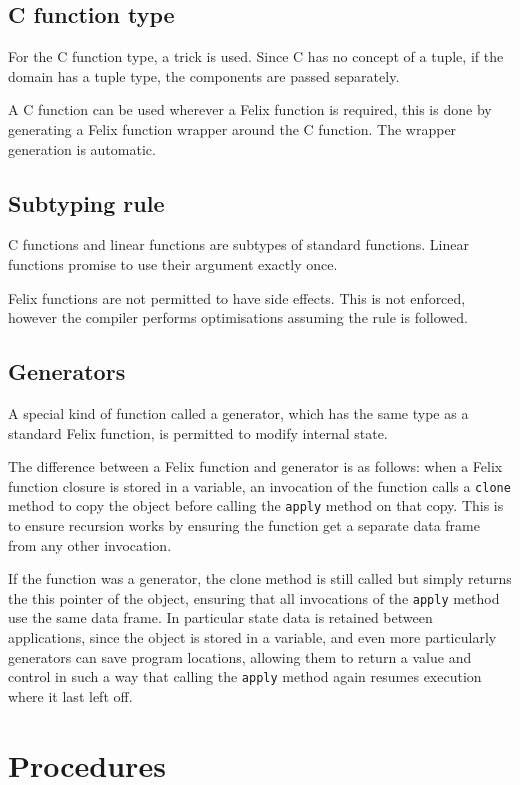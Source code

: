 \documentclass[oneside]{book}
\begin{document}
\subsection{C function type}
For the C function type, a trick is used. Since C has no concept of a tuple,
if the domain has a tuple type, the components are passed separately.

A C function can be used wherever a Felix function is required, this is done
by generating a Felix function wrapper around the C function. The wrapper
generation is automatic.

\subsection{Subtyping rule}
C functions and linear functions are subtypes of standard functions.
Linear functions promise to use their argument exactly once.

Felix functions are not permitted to have side effects. This is not
enforced, however the compiler performs optimisations assuming the rule
is followed.

\subsection{Generators}
A special kind of function called a generator, which has the same type
as a standard Felix function, is permitted to modify internal state.

The difference between a Felix function and generator is as follows:
when a Felix function closure is stored in a variable, an invocation of the function
calls a \verb$clone$ method to copy the object before calling the \verb$apply$ method
on that copy. This is to ensure recursion
works by ensuring the function get a separate data frame from any other
invocation.

If the function was a generator, the clone method is still called but simply
returns the this pointer of the object, ensuring that all invocations
of the \verb$apply$ method use the same data frame. In particular state
data is retained between applications, since the object is stored in a variable,
and even more particularly generators can save program locations, allowing them
to return a value and control in such a way that calling the \verb$apply$ method
again resumes execution where it last left off.


\section{Procedures}
\end{document}
